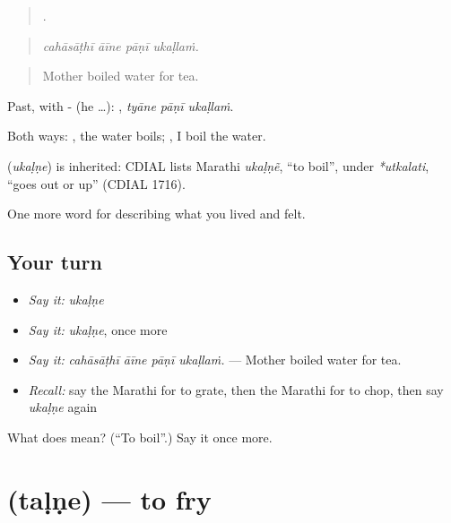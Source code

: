 \begin{quote}
   .
\end{quote}

\begin{quote}
\emph{cahāsāṭhī āīne pāṇī ukaḷlaṁ.}
\end{quote}

\begin{quote}
Mother boiled water for tea.
\end{quote}

Past, with - (he …):   , \emph{tyāne pāṇī ukaḷlaṁ}.

Both ways:  , the water boils;   , I boil the water.

\begin{cousinweb}
\textbf{} (\emph{ukaḷṇe}) is inherited: CDIAL lists Marathi \emph{ukaḷṇẽ}, \textquotedblleft{}to boil\textquotedblright{}, under \emph{*utkalati}, \textquotedblleft{}goes out or up\textquotedblright{} (CDIAL 1716).
\end{cousinweb}

\begin{grammarlens}[title={What you've built}]
One more word for describing what you lived and felt.
\end{grammarlens}

\subsection*{Your turn}
\begin{itemize}
\raggedright
  \item \emph{Say it:} \emph{ukaḷṇe}
  \item \emph{Say it:} \emph{ukaḷṇe}, once more
  \item \emph{Say it:} \emph{cahāsāṭhī āīne pāṇī ukaḷlaṁ.} — Mother boiled water for tea.
  \item \emph{Recall:} say the Marathi for to grate, then the Marathi for to chop, then say \emph{ukaḷṇe} again
\end{itemize}

\begin{tcolorbox}[breakable,colback=teal!4,colframe=teal!35!black,title={Before you move on}]
What does  mean? (\textquotedblleft{}To boil\textquotedblright{}.) Say it once more.
\end{tcolorbox}
\section[\texorpdfstring{\mr{तळणे} (taḷṇe)}{तळणे (taḷṇe)}]{ (taḷṇe) — to fry}

